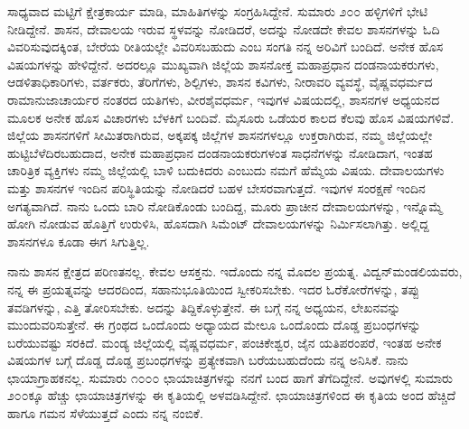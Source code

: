 ಸಾಧ್ಯವಾದ ಮಟ್ಟಿಗೆ ಕ್ಷೇತ್ರಕಾರ್ಯ ಮಾಡಿ, ಮಾಹಿತಿಗಳನ್ನು ಸಂಗ್ರಹಿಸಿದ್ದೇನೆ. ಸುಮಾರು ೨೦೦ ಹಳ್ಳಿಗಳಿಗೆ ಭೇಟಿ ನೀಡಿದ್ದೇನೆ. ಶಾಸನ, ದೇವಾಲಯ ಇರುವ ಸ್ಥಳವನ್ನು ನೋಡಿದರೆ, ಅದನ್ನು ನೋಡದೇ ಕೇವಲ ಶಾಸನಗಳನ್ನು ಓದಿ ವಿವರಿಸುವುದಕ್ಕಿಂತ, ಬೇರೆಯ ರೀತಿಯಲ್ಲೇ ವಿವರಿಸಬಹುದು ಎಂಬ ಸಂಗತಿ ನನ್ನ ಅರಿವಿಗೆ ಬಂದಿದೆ. ಅನೇಕ ಹೊಸ ವಿಷಯಗಳನ್ನು ಹೇಳಿದ್ದೇನೆ. ಅದರಲ್ಲೂ ಮುಖ್ಯವಾಗಿ ಜಿಲ್ಲೆಯ ಶಾಸನೋಕ್ತ ಮಹಾಪ್ರಧಾನ ದಂಡನಾಯಕರುಗಳು, ಆಡಳಿತಾಧಿಕಾರಿಗಳು, ವರ್ತಕರು, ತೆರಿಗೆಗಳು, ಶಿಲ್ಪಿಗಳು, ಶಾಸನ ಕವಿಗಳು, ನೀರಾವರಿ ವ್ಯವಸ್ಥೆ, ವೈಷ್ಣವಧರ್ಮದ ರಾಮಾನುಜಾಚಾರ್ಯರ ನಂತರದ ಯತಿಗಳು, ವೀರಶೈವಧರ್ಮ, ಇವುಗಳ ವಿಷಯದಲ್ಲಿ, ಶಾಸನಗಳ ಅಧ್ಯಯನದ ಮೂಲಕ ಅನೇಕ ಹೊಸ ವಿಚಾರಗಳು ಬೆಳಕಿಗೆ ಬಂದಿವೆ. ಮೈಸೂರು ಒಡೆಯರ ಕಾಲದ ಕೆಲವು ಹೊಸ ವಿಷಯಗಳಿವೆ. ಜಿಲ್ಲೆಯ ಶಾಸನಗಳಿಗೆ ಸೀಮಿತರಾಗಿರುವ, ಅಕ್ಕಪಕ್ಕ ಜಿಲ್ಲೆಗಳ ಶಾಸನಗಳಲ್ಲೂ ಉಕ್ತರಾಗಿರುವ, ನಮ್ಮ ಜಿಲ್ಲೆಯಲ್ಲೇ ಹುಟ್ಟಿಬೆಳೆದಿರಬಹುದಾದ, ಅನೇಕ ಮಹಾಪ್ರಧಾನ ದಂಡನಾಯಕರುಗಳಂತ ಸಾಧನೆಗಳನ್ನು ನೋಡಿದಾಗ, ಇಂತಹ ಚಾರಿತ್ರಿಕ ವ್ಯಕ್ತಿಗಳು ನಮ್ಮ ಜಿಲ್ಲೆಯಲ್ಲಿ ಬಾಳಿ ಬದುಕಿದರು ಎಂಬುದು ನಮಗೆ ಹೆಮ್ಮೆಯ ವಿಷಯ. ದೇವಾಲಯಗಳು ಮತ್ತು ಶಾಸನಗಳ ಇಂದಿನ ಪರಿಸ್ಥಿತಿಯನ್ನು ನೋಡಿದರೆ ಬಹಳ ಬೇಸರವಾಗುತ್ತದೆ. ಇವುಗಳ ಸಂರಕ್ಷಣೆ ಇಂದಿನ ಅಗತ್ಯವಾಗಿದೆ. ನಾನು ಒಂದು ಬಾರಿ ನೋಡಿಕೊಂಡು ಬಂದಿದ್ದ, ಮೂರು ಪ್ರಾಚೀನ ದೇವಾಲಯಗಳನ್ನು, ಇನ್ನೊಮ್ಮೆ ಹೋಗಿ ನೋಡುವ ಹೊತ್ತಿಗೆ ಉರುಳಿಸಿ, ಹೊಸದಾಗಿ ಸಿಮೆಂಟ್​ ದೇವಾಲಯಗಳನ್ನು ನಿರ್ಮಿಸಲಾಗಿತ್ತು. ಅಲ್ಲಿದ್ದ ಶಾಸನಗಳೂ ಕೂಡಾ ಈಗ ಸಿಗುತ್ತಿಲ್ಲ.

ನಾನು ಶಾಸನ ಕ್ಷೇತ್ರದ ಪರಿಣತನಲ್ಲ. ಕೇವಲ ಆಸಕ್ತನು. ಇದೊಂದು ನನ್ನ ಮೊದಲ ಪ್ರಯತ್ನ. ವಿದ್ವನ್​ ಮಂಡಲಿಯವರು, ನನ್ನ ಈ ಪ್ರಯತ್ನವನ್ನು ಆದರದಿಂದ, ಸಹಾನುಭೂತಿಯಿಂದ ಸ್ವೀಕರಿಸಬೇಕು. ಇದರ ಓರೆಕೋರೆಗಳನ್ನು, ತಪ್ಪು ತವಡಿಗಳನ್ನು, ಎತ್ತಿ ತೋರಿಸಬೇಕು. ಅದನ್ನು ತಿದ್ದಿಕೊಳ್ಳುತ್ತೇನೆ. ಈ ಬಗ್ಗೆ ನನ್ನ ಅಧ್ಯಯನ, ಲೇಖನವನ್ನು ಮುಂದುವರಿಸುತ್ತೇನೆ. ಈ ಗ್ರಂಥದ ಒಂದೊಂದು ಅಧ್ಯಾಯದ ಮೇಲೂ ಒಂದೊಂದು ದೊಡ್ಡ ಪ್ರಬಂಧಗಳನ್ನು ಬರೆಯುವಷ್ಟು ಸರಕಿದೆ. ಮಂಡ್ಯ ಜಿಲ್ಲೆಯಲ್ಲಿ ವೈಷ್ಣವಧರ್ಮ, ಪಂಚಿಕೇಶ್ವರ, ಜೈನ ಯತಿಪರಂಪರೆ, ಇಂತಹ ಅನೇಕ ವಿಷಯಗಳ ಬಗ್ಗೆ ದೊಡ್ಡ ದೊಡ್ಡ ಪ್ರಬಂಧಗಳನ್ನು ಪ್ರತ್ಯೇಕವಾಗಿ ಬರೆಯಬಹುದೆಂದು ನನ್ನ ಅನಿಸಿಕೆ. ನಾನು ಛಾಯಾಗ್ರಾಹಕನಲ್ಲ. ಸುಮಾರು ೧೦೦೦ ಛಾಯಾಚಿತ್ರಗಳನ್ನು ನನಗೆ ಬಂದ ಹಾಗೆ ತೆಗೆದಿದ್ದೇನೆ. ಅವುಗಳಲ್ಲಿ ಸುಮಾರು ೨೦೦ಕ್ಕೂ ಹೆಚ್ಚು ಛಾಯಾಚಿತ್ರಗಳನ್ನು ಈ ಕೃತಿಯಲ್ಲಿ ಅಳವಡಿಸಿದ್ದೇನೆ. ಛಾಯಾಚಿತ್ರಗಳಿಂದ ಈ ಕೃತಿಯ ಅಂದ ಹೆಚ್ಚಿದೆ ಹಾಗೂ ಗಮನ ಸೆಳೆಯುತ್ತದೆ ಎಂದು ನನ್ನ ನಂಬಿಕೆ.


